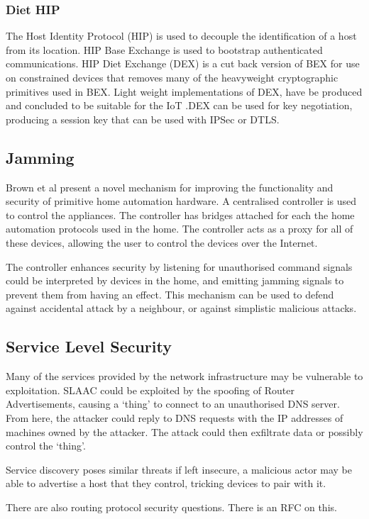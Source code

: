 \documentclass[10pt,journal,compsoc]{IEEEtran}
\begin{document}
\subsubsection{Diet HIP}
The Host Identity Protocol (HIP) is used to decouple the identification of a
host from its location. HIP Base Exchange is used to bootstrap authenticated
communications. HIP Diet Exchange (DEX) is a cut back version of BEX for use on
constrained devices that removes many of the heavyweight cryptographic
primitives used in BEX.  Light weight implementations of DEX, have be produced
and concluded to be suitable for the IoT \cite{Meca2013}.DEX can be used for
key negotiation, producing a session key that can be used with IPSec or DTLS. 

\subsection{Jamming}
Brown et al \cite{Brown2013} present a novel mechanism for improving the
functionality and security of primitive home automation hardware. A centralised
controller is used to control the appliances. The controller has bridges
attached for each the home automation protocols used in the home. The
controller acts as a proxy for all of these devices, allowing the user to
control the devices over the Internet. 

The controller enhances security by listening for unauthorised command signals
could be interpreted by devices in the home, and emitting jamming signals to
prevent them from having an effect. This mechanism can be used to defend
against accidental attack by a neighbour, or against simplistic malicious
attacks. 

\subsection{Service Level Security}
Many of the services provided by the network infrastructure may be vulnerable
to exploitation. SLAAC could be exploited by the spoofing of Router
Advertisements, causing a `thing' to connect to an unauthorised DNS server.
From here, the attacker could reply to DNS requests with the IP addresses of
machines owned by the attacker. The attack could then exfiltrate data or
possibly control the `thing'.

Service discovery poses similar threats if left insecure, a malicious actor may
be able to advertise a host that they control, tricking devices to pair with
it.

There are also routing protocol security questions. There is an RFC on this.  
\end{document}
